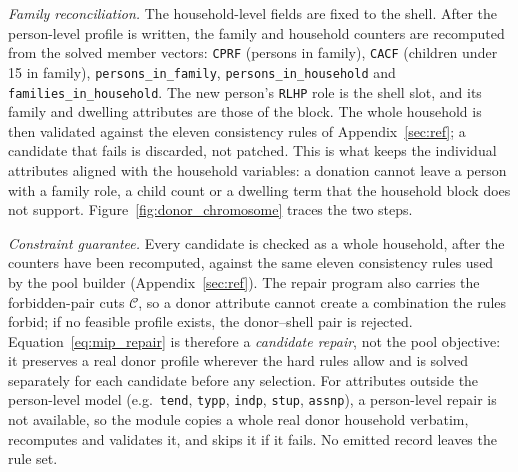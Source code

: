 \emph{Family reconciliation.} The household-level fields are fixed to the
shell. After the person-level profile is written, the family and household
counters are recomputed from the solved member vectors: \texttt{CPRF} (persons
in family), \texttt{CACF} (children under 15 in family),
\texttt{persons\_in\_family}, \texttt{persons\_in\_household} and
\texttt{families\_in\_household}. The new person's \texttt{RLHP} role is the
shell slot, and its family and dwelling attributes are those of the block. The
whole household is then validated against the eleven consistency rules of
Appendix~\ref{sec:ref}; a candidate that fails is discarded, not patched. This
is what keeps the individual attributes aligned with the household variables: a
donation cannot leave a person with a family role, a child count or a dwelling
term that the household block does not support. Figure~\ref{fig:donor_chromosome}
traces the two steps.



\emph{Constraint guarantee.} Every candidate is checked as a whole household,
after the counters have been recomputed, against the same eleven consistency rules used by
the pool builder (Appendix~\ref{sec:ref}). The repair program also carries the
forbidden-pair cuts $\mathcal{C}$, so a donor attribute cannot create a
combination the rules forbid; if no feasible profile exists, the donor--shell
pair is rejected. Equation~\eqref{eq:mip_repair} is therefore a
\emph{candidate repair}, not the pool objective: it preserves a real donor
profile wherever the hard rules allow and is solved separately for each
candidate before any selection. For attributes outside the person-level model
(e.g.\ \texttt{tend}, \texttt{typp}, \texttt{indp}, \texttt{stup},
\texttt{assnp}), a person-level repair is not available, so the module copies a
whole real donor household verbatim, recomputes and validates it, and skips it
if it fails. No emitted record leaves the rule set.

